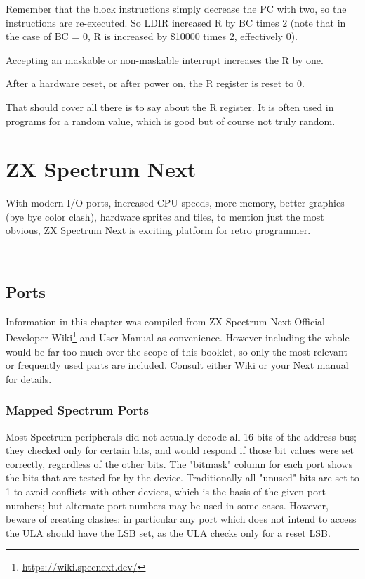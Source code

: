 \documentclass[12pt,twoside,openright,a4paper]{book}
\begin{document}
Remember that the block instructions simply decrease the PC with two, so the instructions are re-executed. So LDIR increased R by BC times 2 (note that in the case of BC = 0, R is increased by \$10000 times 2, effectively 0).

Accepting an maskable or non-maskable interrupt increases the R by one.

After a hardware reset, or after power on, the R register is reset to 0.

That should cover all there is to say about the R register. It is often used in programs for a random value, which is good but of course not truly random.




\chapter{ZX Spectrum Next}

With modern I/O ports, increased CPU speeds, more memory, better graphics (bye bye color clash), hardware sprites and tiles, to mention just the most obvious, ZX Spectrum Next is exciting platform for retro programmer.

~ %

\minitoc

\pagebreak
\section{Ports}

Information in this chapter was compiled from ZX Spectrum Next Official Developer Wiki\footnote{\url{https://wiki.specnext.dev/}} and User Manual as convenience. However including the whole would be far too much over the scope of this booklet, so only the most relevant or frequently used parts are included. Consult either Wiki or your Next manual for details.


\subsection{Mapped Spectrum Ports}

Most Spectrum peripherals did not actually decode all 16 bits of the address bus; they checked only for certain bits, and would respond if those bit values were set correctly, regardless of the other bits. The "bitmask" column for each port shows the bits that are tested for by the device. Traditionally all "unused" bits are set to 1 to avoid conflicts with other devices, which is the basis of the given port numbers; but alternate port numbers may be used in some cases. However, beware of creating clashes: in particular any port which does not intend to access the ULA should have the LSB set, as the ULA checks only for a reset LSB.
\end{document}
